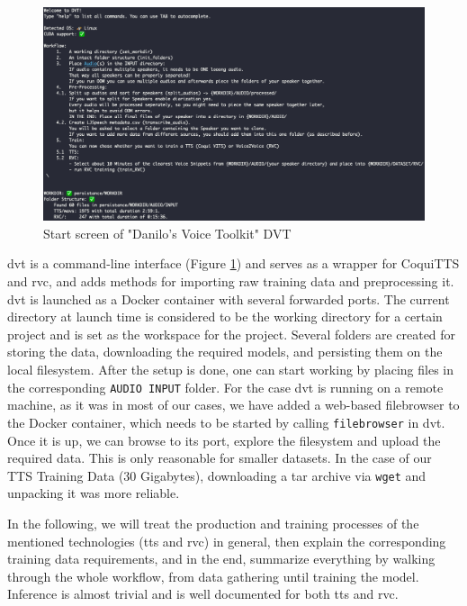 \documentclass[
  a4paper,  %
  twoside,  %
  bibliography=totoc,
  headsepline,
  cleardoublepage=empty,
  parskip=half,
  draft=false
]{scrbook}
\begin{document}
\begin{figure}[h]
  \centering
  \includegraphics[width=1\textwidth]{./graphics/dvt-screen.png}
  \caption{Start screen of "Danilo's Voice Toolkit" DVT}
  \label{fig:dvt-interface}
\end{figure}

\gls{dvt} is a command-line interface (Figure \ref{fig:dvt-interface}) and serves as a wrapper for CoquiTTS and \gls{rvc}, and adds methods for importing raw training data and preprocessing it. \\
\gls{dvt} is launched as a Docker container with several forwarded ports. The current directory at launch time is considered to be the working directory for a certain project and is set as the workspace for the project. Several folders are created for storing the data, downloading the required models, and persisting them on the local filesystem. After the setup is done, one can start working by placing files in the corresponding \verb|AUDIO INPUT| folder. For the case \gls{dvt} is running on a remote machine, as it was in most of our cases, we have added a web-based filebrowser to the Docker container, which needs to be started by calling \verb|filebrowser| in \gls{dvt}. Once it is up, we can browse to its port, explore the filesystem and upload the required data. This is only reasonable for smaller datasets. In the case of our TTS Training Data (30 Gigabytes), downloading a tar archive via \verb|wget| and unpacking it was more reliable. 

In the following, we will treat the production and training processes of the mentioned technologies (\gls{tts} and \gls{rvc}) in general, then explain the corresponding training data requirements, and in the end, summarize everything by walking through the whole workflow, from data gathering until training the model. Inference is almost trivial and is well documented for both \gls{tts} and \gls{rvc}.
\end{document}
